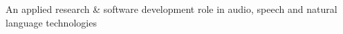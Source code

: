 

\begin{cvskills}

  \cvskill
    {}
    {An applied research \& software development role in audio, speech and natural language technologies}

\end{cvskills}